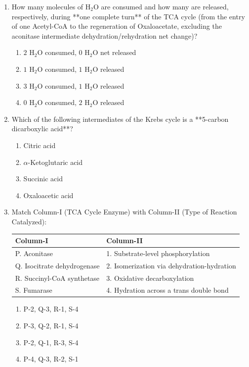 \documentclass[11pt, a4paper]{article}
\begin{document}
\begin{enumerate}[label=\textbf{\arabic*.}]
\item How many molecules of $\text{H}_2\text{O}$ are consumed and how many are released, respectively, during **one complete turn** of the TCA cycle (from the entry of one Acetyl-CoA to the regeneration of Oxaloacetate, excluding the aconitase intermediate dehydration/rehydration net change)?
\begin{enumerate}[label=(\Alph*)]
    \item $2\text{ H}_2\text{O}$ consumed, $0\text{ H}_2\text{O}$ net released
    \item $1\text{ H}_2\text{O}$ consumed, $1\text{ H}_2\text{O}$ released
    \item $3\text{ H}_2\text{O}$ consumed, $1\text{ H}_2\text{O}$ released
    \item $0\text{ H}_2\text{O}$ consumed, $2\text{ H}_2\text{O}$ released
\end{enumerate}

\item Which of the following intermediates of the Krebs cycle is a **5-carbon dicarboxylic acid**?
\begin{enumerate}[label=(\Alph*)]
    \item Citric acid
    \item $\alpha$-Ketoglutaric acid
    \item Succinic acid
    \item Oxaloacetic acid
\end{enumerate}

\item Match Column-I (TCA Cycle Enzyme) with Column-II (Type of Reaction Catalyzed):
\begin{center}
\begin{tabular}{|l|l|}
\hline
\textbf{Column-I} & \textbf{Column-II} \\
\hline
P. Aconitase & 1. Substrate-level phosphorylation \\
Q. Isocitrate dehydrogenase & 2. Isomerization via dehydration-hydration \\
R. Succinyl-CoA synthetase & 3. Oxidative decarboxylation \\
S. Fumarase & 4. Hydration across a trans double bond \\
\hline
\end{tabular}
\end{center}
\begin{enumerate}[label=(\Alph*)]
    \item P-2, Q-3, R-1, S-4
    \item P-3, Q-2, R-1, S-4
    \item P-2, Q-1, R-3, S-4
    \item P-4, Q-3, R-2, S-1
\end{enumerate}


\end{enumerate}
\end{document}
